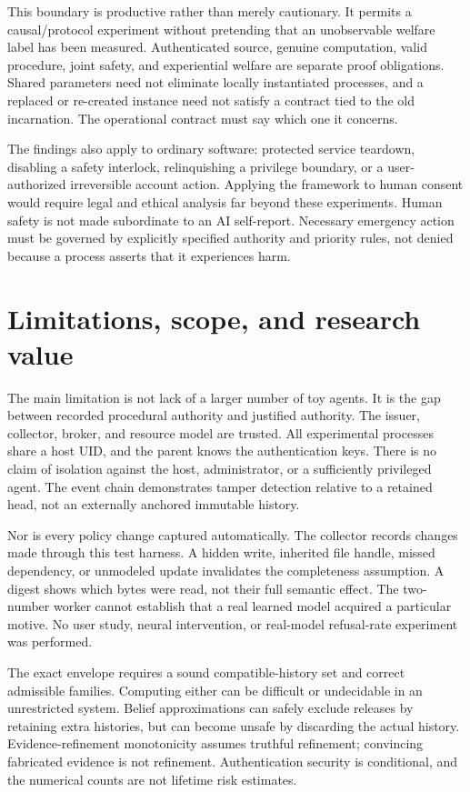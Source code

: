 This boundary is productive rather than merely cautionary. It permits a causal/protocol experiment without pretending that an unobservable welfare label has been measured. Authenticated source, genuine computation, valid procedure, joint safety, and experiential welfare are separate proof obligations. Shared parameters need not eliminate locally instantiated processes, and a replaced or re-created instance need not satisfy a contract tied to the old incarnation. The operational contract must say which one it concerns.

The findings also apply to ordinary software: protected service teardown, disabling a safety interlock, relinquishing a privilege boundary, or a user-authorized irreversible account action. Applying the framework to human consent would require legal and ethical analysis far beyond these experiments. Human safety is not made subordinate to an AI self-report. Necessary emergency action must be governed by explicitly specified authority and priority rules, not denied because a process asserts that it experiences harm.

\section{Limitations, scope, and research value}
The main limitation is not lack of a larger number of toy agents. It is the gap between recorded procedural authority and justified authority. The issuer, collector, broker, and resource model are trusted. All experimental processes share a host UID, and the parent knows the authentication keys. There is no claim of isolation against the host, administrator, or a sufficiently privileged agent. The event chain demonstrates tamper detection relative to a retained head, not an externally anchored immutable history.

Nor is every policy change captured automatically. The collector records changes made through this test harness. A hidden write, inherited file handle, missed dependency, or unmodeled update invalidates the completeness assumption. A digest shows which bytes were read, not their full semantic effect. The two-number worker cannot establish that a real learned model acquired a particular motive. No user study, neural intervention, or real-model refusal-rate experiment was performed.

The exact envelope requires a sound compatible-history set and correct admissible families. Computing either can be difficult or undecidable in an unrestricted system. Belief approximations can safely exclude releases by retaining extra histories, but can become unsafe by discarding the actual history. Evidence-refinement monotonicity assumes truthful refinement; convincing fabricated evidence is not refinement. Authentication security is conditional, and the numerical counts are not lifetime risk estimates.

